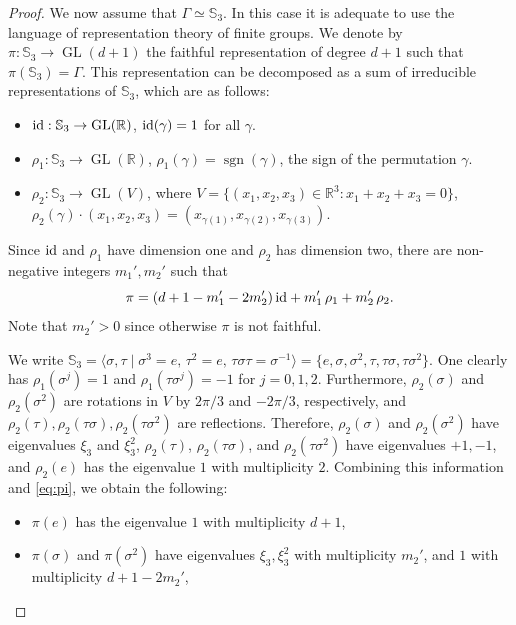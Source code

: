 \documentclass[12pt,a4paper,final]{amsart}
\theoremstyle{plain}
\theoremstyle{definition}
\theoremstyle{remark}
\numberwithin{equation}{section}
\newcommand{\R}{\mathbb R}
\DeclareMathOperator{\GL}{GL}
\newcommand{\op}{\operatorname}
\newcommand{\id}{\textup{id}}
\begin{document}
\begin{proof}
We now assume that $\Gamma\simeq\mathbb S_3$. 
In this case it is adequate to use the language of representation theory of finite groups. 
We denote by $\pi:\mathbb S_3\to\GL(d+1)$ the faithful representation of degree $d+1$ such that $\pi(\mathbb S_3)=\Gamma$. 
This representation can be decomposed as a sum of irreducible representations of $\mathbb S_3$, which are as follows:
\begin{itemize}
\item $\id:\mathbb S_3\to\GL(\R)$, $\id(\gamma)=1$ for all $\gamma$. 

\item $\rho_1:\mathbb S_3\to\GL(\R)$, $\rho_1(\gamma)=\op{sgn}(\gamma)$, the sign of the permutation $\gamma$. 

\item $\rho_2:\mathbb S_3\to\GL(V)$, where $V=\{(x_1,x_2,x_3)\in\R^3: x_1+x_2+x_3=0\}$,  $\rho_2(\gamma)\cdot (x_1,x_2,x_3)= (x_{\gamma(1)},x_{\gamma(2)},x_{\gamma(3)})$. 
\end{itemize}
Since $\id$ and $\rho_1$ have dimension one and $\rho_2$ has dimension two, there are non-negative integers $m_1',m_2'$ such that 
\begin{equation}\label{eq:pi}
\pi=(d+1-m_1'-2m_2')\,\id + m_1'\,\rho_1 + m_2'\,\rho_2. 
\end{equation}
Note that $m_2'>0$ since otherwise $\pi$ is not faithful. 


We write 
$
\mathbb S_3
=\langle \sigma,\tau\mid  \sigma^3=e,\, \tau^2=e,\, \tau\sigma\tau=\sigma^{-1} \rangle 
=\{e,\sigma,\sigma^2,\tau,\tau\sigma,\tau\sigma^2\}
.
$
One clearly has $\rho_1(\sigma^j)=1$ and $\rho_1(\tau \sigma^j)=-1$ for $j=0,1,2$.
Furthermore, $\rho_2(\sigma)$ and $\rho_2(\sigma^2)$ are rotations in $V$ by $2\pi/3$ and $-2\pi/3$, respectively, and  $\rho_2(\tau),\rho_2(\tau\sigma),\rho_2(\tau\sigma^2)$ are reflections. 
Therefore, 
$\rho_2(\sigma)$ and $\rho_2(\sigma^2)$ have eigenvalues $\xi_3$ and $\xi_3^2$,
$\rho_2(\tau)$, $\rho_2(\tau\sigma)$, and $\rho_2(\tau\sigma^2)$ have eigenvalues $+1,-1$, 
and $\rho_2(e)$ has the eigenvalue $1$ with multiplicity $2$. 
Combining this information and \eqref{eq:pi}, we obtain the following:
\begin{itemize}
\item $\pi(e)$ has the eigenvalue $1$ with multiplicity $d+1$,

\item $\pi(\sigma)$ and $\pi(\sigma^2)$ have eigenvalues $\xi_3,\xi_3^2$ with multiplicity $m_2'$, and $1$ with multiplicity $d+1-2m_2'$,


\end{itemize}
\end{proof}
\end{document}
